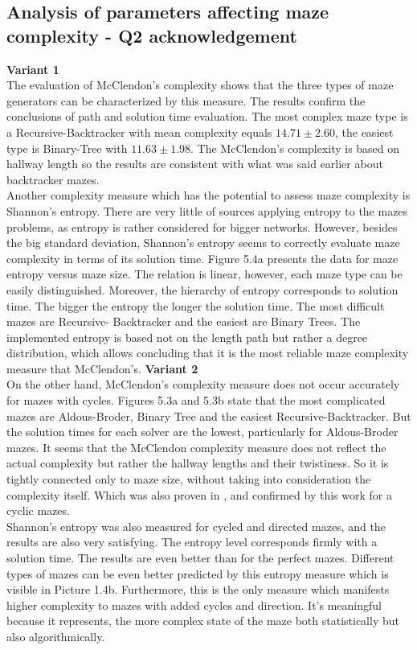 \subsection{Analysis of parameters affecting maze complexity - Q2 acknowledgement}
\textbf{Variant 1}\\
The evaluation of McClendon's complexity shows that the three types of maze generators can be characterized by this measure. The results confirm the conclusions
of path and solution time evaluation. The most complex maze type is a Recursive-Backtracker with mean complexity equals $14.71 \pm 2.60$, the easiest type is 
Binary-Tree with $11.63 \pm 1.98$. The McClendon's complexity is based on hallway length so the results are consistent with what was said earlier about
backtracker mazes.\\
Another complexity measure which has the potential to assess maze complexity is Shannon's entropy. There are very little of sources applying entropy to the mazes problems,
as entropy is rather considered for bigger networks. However, besides the big standard deviation, Shannon's entropy seems to correctly evaluate maze complexity
in terms of its solution time. Figure 5.4a presents the data for maze entropy versus maze size. The relation is linear, however, each maze type can be easily distinguished.
Moreover, the hierarchy of entropy corresponds to solution time. The bigger the entropy the longer the solution time. The most difficult mazes are Recursive- Backtracker and 
the easiest are Binary Trees. The implemented entropy is based not on the length path but rather a degree distribution, which allows concluding that it is the most reliable 
maze complexity measure that McClendon's.
\textbf{Variant 2}\\
On the other hand, McClendon's complexity measure does not occur accurately for mazes with cycles. Figures 5.3a and 5.3b state that the most
complicated mazes are Aldous-Broder, Binary Tree and the easiest Recursive-Backtracker. But the solution times for each solver are the lowest, particularly for 
Aldous-Broder mazes. It seems that the McClendon complexity measure does not reflect the actual complexity but rather the hallway lengths and their twistiness. So it
is tightly connected only to maze size, without taking into consideration the complexity itself.
Which was also proven in \cite{4}, and confirmed by this work for a cyclic mazes.\\
Shannon's entropy was also measured for cycled and directed mazes, and the results are also very satisfying. The entropy level corresponds firmly with a solution time.
The results are even better than for the perfect mazes. Different types of mazes can be even better predicted by this entropy measure which is visible in Picture 1.4b.
Furthermore, this is the only measure which manifests higher complexity to mazes with added cycles and direction. It's meaningful because it represents, the 
more complex state of the maze both statistically but also algorithmically.
